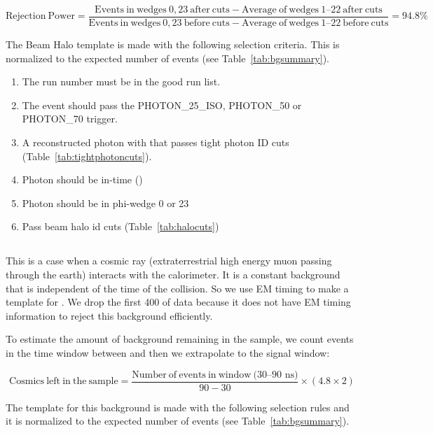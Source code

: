 \documentclass[11pt]{article}
\begin{document}
\begin{equation}
 \mathrm{Rejection~Power}= \frac{\mathrm{Events~in~wedges~0,23~after~cuts} - \mathrm{Average~of~wedges~\textrm{1--22}~after~cuts} }{\mathrm{Events~in~wedges~0,23~before~cuts} - \mathrm{Average~of~wedges~\textrm{1--22}~before~cuts} } = 94.8\%
\end{equation}

\noindent The Beam Halo template is made with the following selection criteria. This is normalized to the expected number of events (see Table~\ref{tab:bgsummary}). 

\begin{enumerate}
	\item The run number must be in the good run list.
	\item The event should pass the PHOTON\_25\_ISO, PHOTON\_50 or \mbox{PHOTON\_70} trigger. 
	\item A reconstructed photon with  that passes tight photon ID cuts (Table~\ref{tab:tightphotoncuts}). 
	\item Photon should be in-time (\intimewindow)
	\item Photon should be in phi-wedge 0 or 23
	\item Pass beam halo id cuts (Table~\ref{tab:halocuts})
\end{enumerate}

\subsection{\cosmicjets}
This is a case when a cosmic ray (extraterrestrial high energy muon passing through the earth) interacts with the calorimeter. It is a constant background that is independent of the time of the collision. So we use EM timing to make a template for \cosmicjets. We drop the first 400 \pbi of data because it does not have EM timing information to reject this background efficiently.

To estimate the amount of background remaining in the sample, we count events in the time window between \cosmictimewindow and then we extrapolate to the signal window: 

\begin{equation}
\mathrm{Cosmics~left~ in~ the~ sample = \frac{Number~of~events~in~window~\textrm{(30--90~ns)}}{90 - 30} \times (4.8\times2)}
\end{equation}

\noindent The template for this background is made with the following selection rules and it is normalized to the expected number of events (see Table~\ref{tab:bgsummary}).
\end{document}
